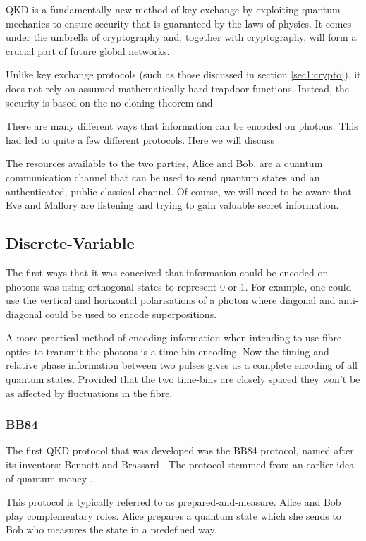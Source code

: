 \Acl{QKD} is a fundamentally new method of key exchange by exploiting quantum mechanics to ensure security that is guaranteed by the laws of physics. It comes under the umbrella of  cryptography and, together with  cryptography, will form a crucial part of future global networks.

Unlike key exchange protocols (such as those discussed in section \ref{sec1:crypto}), it does not rely on assumed mathematically hard trapdoor functions. Instead, the security is based on the no-cloning theorem and 

There are many different ways that information can be encoded on photons. This had led to quite a few different protocols. Here we will discuss 

The resources available to the two parties, Alice and Bob, are a quantum communication channel that can be used to send quantum states and an authenticated, public classical channel. Of course, we will need to be aware that Eve and Mallory are listening and trying to gain valuable secret information.

\subsection{Discrete-Variable}

The first ways that it was conceived that information could be encoded on photons was using orthogonal states to represent 0 or 1. For example, one could use the vertical and horizontal polarisations of a photon where diagonal and anti-diagonal could be used to encode superpositions. 

A more practical method of encoding information when intending to use fibre optics to transmit the photons is a time-bin encoding. Now the timing and relative phase information between two pulses gives us a complete encoding of all quantum states. Provided that the two time-bins are closely spaced they won't be as affected by fluctuations in the fibre.

\subsubsection*{BB84}

The first \ac{QKD} protocol that was developed was the BB84 protocol, named after its inventors: Bennett and Brassard \cite{BB84}. The protocol stemmed from an earlier idea of quantum money \cite{quantum_money}.

This protocol is typically referred to as {\color{bristol-red}prepared-and-measure}. Alice and Bob play complementary roles. Alice {\color{bristol-red}prepares} a quantum state which she sends to Bob who {\color{bristol-red}measures} the state in a predefined way. 

